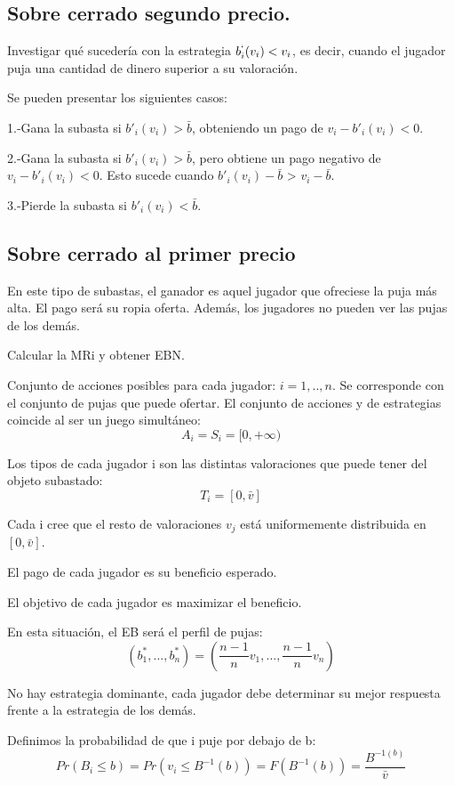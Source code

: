 \documentclass{article}
\begin{document}
\subsection{Sobre cerrado segundo precio.}
Investigar qu\'e suceder\'ia con la estrategia $b_i^`(v_i)<v_i$, es decir, cuando el jugador puja una cantidad de dinero superior a su valoraci\'on.

Se pueden presentar los siguientes casos:

1.-Gana la subasta si $b'_i(v_i)>\bar{b}$, obteniendo un pago de $v_i-b'_i(v_i)<0$.

2.-Gana la subasta si $b'_i(v_i)>\bar{b}$, pero obtiene un pago negativo de $v_i-b'_i(v_i)<0$. Esto sucede cuando $b'_i(v_i)-\bar{b}$ > $v_i-\bar{b}$.

3.-Pierde la subasta si $b'_i(v_i)<\bar{b}$.

\subsection{Sobre cerrado al primer precio}

En este tipo de subastas, el ganador es aquel jugador que ofreciese la puja m\'as alta. El pago ser\'a su ropia oferta. Adem\'as, los jugadores no pueden ver las pujas de los dem\'as.

Calcular la MRi y obtener EBN.

Conjunto de acciones posibles para cada jugador: $i=1,..,n$. Se corresponde con el conjunto de pujas que puede ofertar.
El conjunto de acciones y de estrategias coincide al ser un juego simult\'aneo:
$$A_i=S_i=[0,+\infty)$$

Los tipos de cada jugador i son las distintas valoraciones que puede tener del objeto subastado:
$$T_i=[0,\bar{v}]$$

Cada i cree que el resto de valoraciones $v_j$ est\'a uniformemente distribuida en $[0,\bar{v}]$.

El pago de cada jugador es su beneficio esperado.

El objetivo de cada jugador es maximizar el beneficio.

En esta situaci\'on, el EB ser\'a el perfil de pujas:
$${(b_1^*,...,b_n^*)}={(\frac{n-1}{n}v_1,...,\frac{n-1}{n}v_n)}$$

No hay estrategia dominante, cada jugador debe determinar su mejor respuesta frente a la estrategia de los dem\'as.

Definimos la probabilidad de que i puje por debajo de b:
$$Pr(B_i\leq b)=Pr(v_i\leq B^{-1}(b))=F(B^{-1}(b))=\frac{B^{-1(b)}}{\bar{v}}$$
\end{document}
